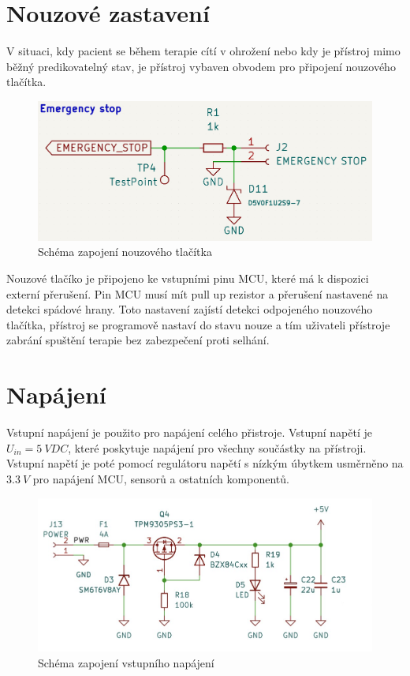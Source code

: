 \section{Nouzové zastavení}
V situaci, kdy pacient se během terapie cítí v ohrožení nebo kdy je přístroj mimo běžný predikovatelný stav, je přístroj vybaven obvodem pro připojení nouzového tlačítka.
\begin{figure}[H]
    \includegraphics[width=0.9\linewidth]{pictures/e_stop.jpg}
    \caption{Schéma zapojení nouzového tlačítka}
    \label{fig:e_stop}
\end{figure}
Nouzové tlačíko je připojeno ke vstupními pinu MCU, které má k dispozici externí přerušení. Pin MCU musí mít pull up rezistor a přerušení nastavené na detekci spádové hrany. Toto nastavení zajístí
detekci odpojeného nouzového tlačítka, přístroj se programově nastaví do stavu nouze a tím uživateli přístroje zabrání spuštění terapie bez zabezpečení proti selhání.
\section{Napájení}
Vstupní napájení je použito pro napájení celého přistroje. Vstupní napětí je $U_{in} = 5 \ V DC$, které poskytuje napájení pro všechny součástky na přístroji. Vstupní napětí je poté pomocí regulátoru napětí s nízkým úbytkem usměrněno na $3.3 \ V$ pro napájení MCU, sensorů a ostatních komponentů.

\begin{figure}[H]
    \includegraphics[width=0.9\linewidth]{pictures/power.jpg}
    \caption{Schéma zapojení vstupního napájení}
    \label{fig:power_input}
\end{figure}

